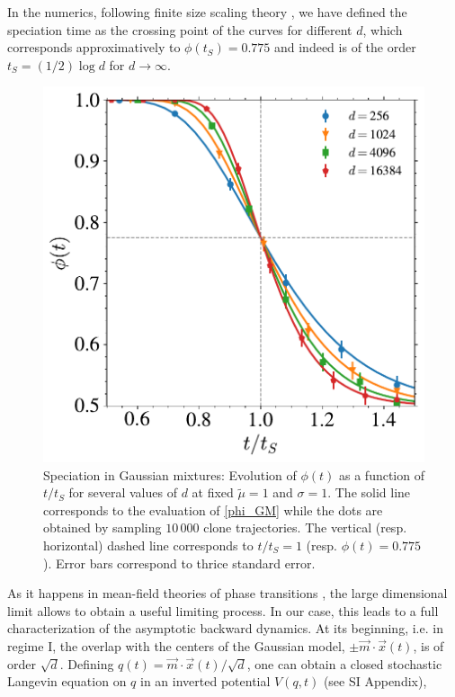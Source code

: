 \documentclass[10pt,twocolumn]{article}
\begin{document}
In the numerics, following finite size scaling theory \cite{privman1990finite}, we have defined the speciation time as the crossing point of the curves for different $d$, which corresponds approximatively to $\phi(t_S)=0.775$ and indeed is of the order $t_S= (1/2)\log d$ for $d\rightarrow \infty$. 
\begin{figure}%
\centering
\includegraphics[width=1\linewidth]{Figures/Speciation_GM.pdf}
\caption{Speciation in Gaussian mixtures: Evolution of $\phi(t)$ as a function of $t/t_S$ for several values of $d$ at fixed $\tilde{\mu} = 1$ and $\sigma = 1$. The solid line corresponds to the evaluation of \eqref{phi_GM} while the dots are obtained by sampling $10\,000$ clone trajectories. The vertical (resp. horizontal) dashed line corresponds to $t/t_S = 1$ (resp. $\phi(t) = 0.775$). Error bars correspond to thrice standard error.}
\label{fig:speciation_GM}
\end{figure}
As it happens in mean-field theories of phase transitions \cite{opper2001advanced}, the large dimensional limit allows to obtain a useful limiting process. In our case, this leads to a full characterization of the asymptotic backward dynamics. At its beginning, i.e. in regime I, the overlap with the centers of the Gaussian model, $\pm \vec m\cdot\vec x(t)$, is of order $\sqrt{d}$. Defining $q(t)=\vec m\cdot \vec x(t) / \sqrt{d}$, one can obtain a closed stochastic Langevin equation on $q$ in an inverted potential $V(q, t)$ (see SI Appendix),
\end{document}
